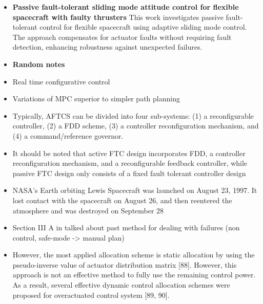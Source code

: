 \begin{itemize}
\begin{itemize}
    \item \textbf{Passive fault-tolerant sliding mode attitude control for flexible spacecraft with faulty thrusters} \cite{Mirshams2014PassiveThrusters} This work investigates passive fault-tolerant control for flexible spacecraft using adaptive sliding mode control. The approach compensates for actuator faults without requiring fault detection, enhancing robustness against unexpected failures.
\end{itemize}

\end{itemize}


\begin{itemize}
    \item \textbf{Random notes}
    \item Real time configurative control
    \item Variations of MPC superior to simpler path planning
    \item Typically, AFTCS can be divided into four sub-systems: (1)
         a reconfigurable controller, (2) a FDD scheme, (3) a controller
         reconfiguration mechanism, and (4) a command/reference
         governor.\cite{Zhang2008BibliographicalSystems}

 \item It should be noted that active FTC design incorporates FDD, 
        a controller reconfiguration mechanism, and a reconfigurable 
        feedback controller, while passive FTC design only consists of 
        a fixed fault tolerant controller design \cite{Yin2016ASystem}

        \item NASA’s Earth orbiting Lewis Spacecraft was launched on 
        August 23, 1997. It lost contact with the spacecraft on August 
        26, and then reentered the atmosphere and was destroyed on 
        September 28 \cite{Yin2016ASystem}

        \item Section III A in \cite{Yin2016ASystem} talked about past method for dealing with failures (non control, safe-mode -> manual plan)

        \item However, 
        the most applied allocation scheme is static allocation by using 
        the pseudo-inverse value of actuator distribution matrix [88]. 
        However, this approach is not an effective method to fully use 
        the remaining control power. As a result, several effective 
        dynamic control allocation schemes were proposed for 
        overactuated control system [89, 90]. \cite{Yin2016ASystem}


\end{itemize}
